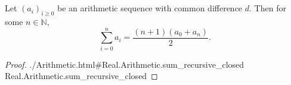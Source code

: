 \documentclass{article}
\newcommand{\lean}[1]{\leanref
  {./Arithmetic.html\#Real.Arithmetic.#1}
  {Real.Arithmetic.#1}}
\begin{document}
\section{}%
\label{sec:sum-arithmetic-series}

Let $(a_i)_{i \geq 0}$ be an arithmetic sequence with common difference $d$.
Then for some $n \in \mathbb{N}$,
$$\sum_{i=0}^n a_i = \frac{(n + 1)(a_0 + a_n)}{2}.$$

\begin{proof}

  \lean{sum\_recursive\_closed}

\end{proof}
\end{document}
